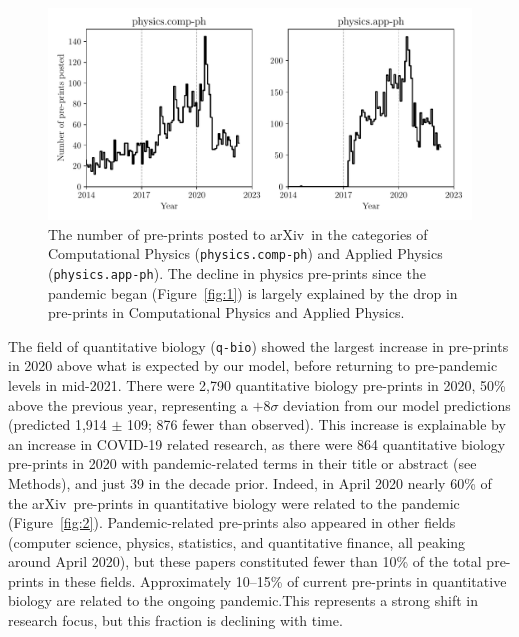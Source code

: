 \documentclass[]{rsos}%
\newcommand{\arxiv}{arXiv}
\begin{document}
\begin{figure}[!t]
\includegraphics[width=0.95\linewidth]{physics-pre-prints}
\caption{The number of pre-prints posted to \arxiv\ in the categories of Computational Physics (\texttt{physics.comp-ph}) and Applied Physics (\texttt{physics.app-ph}). The decline in physics pre-prints since the pandemic began (Figure~\ref{fig:1}) is largely explained by the drop in pre-prints in Computational Physics and Applied Physics.}
\label{fig:physics}
\end{figure}



The field of quantitative biology (\texttt{q-bio}) showed the largest increase in pre-prints in 2020 above what is expected by our model, before returning to pre-pandemic levels in mid-2021. %
There were {2,790} quantitative biology pre-prints in 2020, {50\%} above the previous year, representing a $+8\sigma$ deviation from our model predictions (predicted 1,914 $\pm$ 109; 876 fewer than observed). This increase is explainable by an increase in COVID-19 related research, as there were 864 quantitative biology pre-prints in 2020 with pandemic-related terms in their title or abstract (see Methods), and just 39 in the decade prior. Indeed, in {April 2020} nearly 60\% of the \arxiv\ pre-prints in quantitative biology were related to the pandemic (Figure~\ref{fig:2}). Pandemic-related pre-prints also appeared in other fields (computer science, physics, statistics, and quantitative finance, all peaking around {April 2020}), but these papers constituted fewer than 10\% of the total pre-prints in these fields. Approximately 10--15\% of current pre-prints in quantitative biology are related to the ongoing pandemic.This represents a strong shift in research focus, but this fraction is declining with time. %
\end{document}
